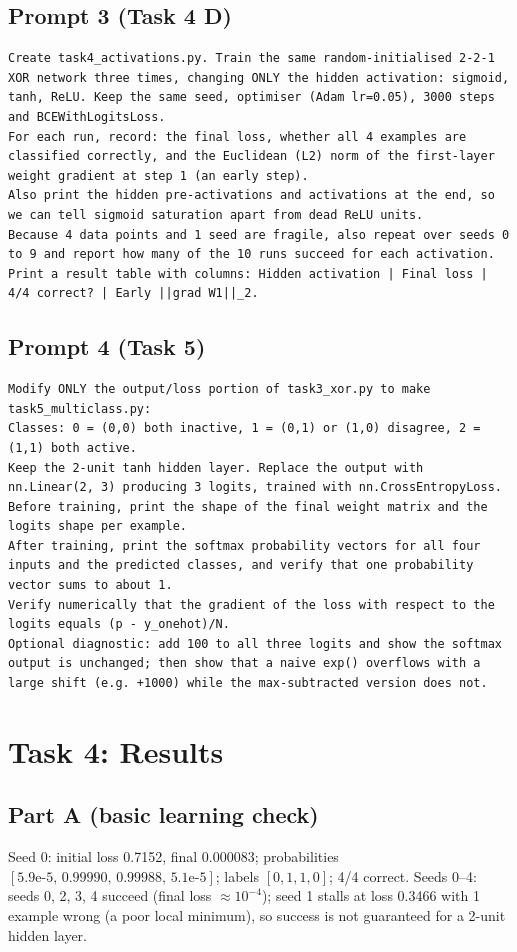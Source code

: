 \documentclass[10pt,a4paper]{article}
\begin{document}
\subsection*{Prompt 3 (Task 4 D)}
\begin{Verbatim}
Create task4_activations.py. Train the same random-initialised 2-2-1 XOR network three times, changing ONLY the hidden activation: sigmoid, tanh, ReLU. Keep the same seed, optimiser (Adam lr=0.05), 3000 steps and BCEWithLogitsLoss.
For each run, record: the final loss, whether all 4 examples are classified correctly, and the Euclidean (L2) norm of the first-layer weight gradient at step 1 (an early step).
Also print the hidden pre-activations and activations at the end, so we can tell sigmoid saturation apart from dead ReLU units.
Because 4 data points and 1 seed are fragile, also repeat over seeds 0 to 9 and report how many of the 10 runs succeed for each activation.
Print a result table with columns: Hidden activation | Final loss | 4/4 correct? | Early ||grad W1||_2.
\end{Verbatim}
\subsection*{Prompt 4 (Task 5)}
\begin{Verbatim}
Modify ONLY the output/loss portion of task3_xor.py to make task5_multiclass.py:
Classes: 0 = (0,0) both inactive, 1 = (0,1) or (1,0) disagree, 2 = (1,1) both active.
Keep the 2-unit tanh hidden layer. Replace the output with nn.Linear(2, 3) producing 3 logits, trained with nn.CrossEntropyLoss.
Before training, print the shape of the final weight matrix and the logits shape per example.
After training, print the softmax probability vectors for all four inputs and the predicted classes, and verify that one probability vector sums to about 1.
Verify numerically that the gradient of the loss with respect to the logits equals (p - y_onehot)/N.
Optional diagnostic: add 100 to all three logits and show the softmax output is unchanged; then show that a naive exp() overflows with a large shift (e.g. +1000) while the max-subtracted version does not.
\end{Verbatim}

\section*{Task 4: Results}
\subsection*{Part A (basic learning check)}
Seed 0: initial loss 0.7152, final 0.000083; probabilities $[5.9\text{e-}5,\,0.99990,\,0.99988,\,5.1\text{e-}5]$; labels $[0,1,1,0]$; 4/4 correct. Seeds 0--4: seeds 0, 2, 3, 4 succeed (final loss $\approx10^{-4}$); seed 1 stalls at loss 0.3466 with 1 example wrong (a poor local minimum), so success is not guaranteed for a 2-unit hidden layer.
\end{document}
